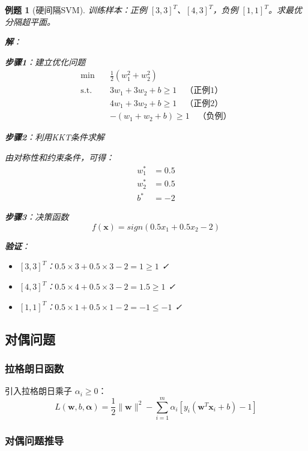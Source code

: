 \documentclass[12pt,a4paper]{ctexart}
\newtheorem{exercise}{例题}[section]
\begin{document}
\begin{exercise}[硬间隔SVM]
训练样本：正例 $[3,3]^T$、$[4,3]^T$，负例 $[1,1]^T$。求最优分隔超平面。

\textbf{解}：

\textbf{步骤1}：建立优化问题
\begin{align*}
\min \quad & \frac{1}{2}(w_1^2 + w_2^2) \\
\text{s.t.} \quad & 3w_1 + 3w_2 + b \geq 1 \quad \text{（正例1）} \\
& 4w_1 + 3w_2 + b \geq 1 \quad \text{（正例2）} \\
& -(w_1 + w_2 + b) \geq 1 \quad \text{（负例）}
\end{align*}

\textbf{步骤2}：利用KKT条件求解

由对称性和约束条件，可得：
\begin{align*}
w_1^* &= 0.5 \\
w_2^* &= 0.5 \\
b^* &= -2
\end{align*}

\textbf{步骤3}：决策函数
\[
\boxed{f(\mathbf{x}) = sign(0.5x_1 + 0.5x_2 - 2)}
\]

\textbf{验证}：
\begin{itemize}
    \item $[3,3]^T$：$0.5 \times 3 + 0.5 \times 3 - 2 = 1 \geq 1$ ✓
    \item $[4,3]^T$：$0.5 \times 4 + 0.5 \times 3 - 2 = 1.5 \geq 1$ ✓
    \item $[1,1]^T$：$0.5 \times 1 + 0.5 \times 1 - 2 = -1 \leq -1$ ✓
\end{itemize}
\end{exercise}

\subsection{对偶问题}

\subsubsection{拉格朗日函数}

引入拉格朗日乘子 $\alpha_i \geq 0$：
\[
L(\mathbf{w}, b, \boldsymbol{\alpha}) = \frac{1}{2}\|\mathbf{w}\|^2 - \sum_{i=1}^{m}\alpha_i\left[y_i(\mathbf{w}^T\mathbf{x}_i + b) - 1\right]
\]

\subsubsection{对偶问题推导}
\end{document}

